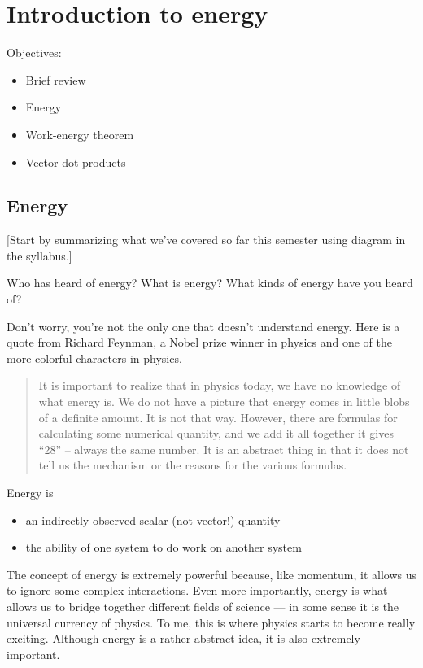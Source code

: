 \section{Introduction to energy}
Objectives:
\begin{itemize}
\item Brief review
\item Energy
\item Work-energy theorem
\item Vector dot products
\end{itemize}
\hrulefill
\subsection{Energy}
[Start by summarizing what we've covered so far this semester using diagram in the syllabus.]

Who has heard of energy? What is energy? What kinds of energy have you heard of?

Don't worry, you're not the only one that doesn't understand energy. Here is a quote from Richard Feynman, a Nobel prize winner in physics and one of the more colorful characters in physics.

\begin{quote}
It is important to realize that in physics today, we have no knowledge of what energy is. We do not have a picture that energy comes in little blobs of a definite amount. It is not that way. However, there are formulas for calculating some numerical quantity, and we add it all together it gives ``28'' --  always the same number. It is an abstract thing in that it does not tell us the mechanism or the reasons for the various formulas.
\end{quote}

Energy is
\begin{itemize}
\item an indirectly observed scalar (not vector!) quantity
\item the ability of one system to do work on another system
\end{itemize}

The concept of energy is extremely powerful because, like momentum, it allows us to ignore some complex interactions. Even more importantly, energy is what allows us to bridge together different fields of science --- in some sense it is the universal currency of physics. To me, this is where physics starts to become really exciting. Although energy is a rather abstract idea, it is also extremely important. 

